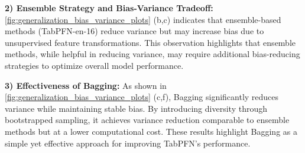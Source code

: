 \textbf{2) Ensemble Strategy and Bias-Variance Tradeoff:}  
\autoref{fig:generalization_bias_variance_plots} (b,c) indicates that ensemble-based methods (TabPFN-en-16) reduce variance but may increase bias due to unsupervised feature transformations. This observation highlights that ensemble methods, while helpful in reducing variance, may require additional bias-reducing strategies to optimize overall model performance. 

\textbf{3) Effectiveness of Bagging:}  
As shown in \autoref{fig:generalization_bias_variance_plots} (c,f), Bagging significantly reduces variance while maintaining stable bias. By introducing diversity through bootstrapped sampling, it achieves variance reduction comparable to ensemble methods but at a lower computational cost. These results highlight Bagging as a simple yet effective approach for improving TabPFN’s performance. 




